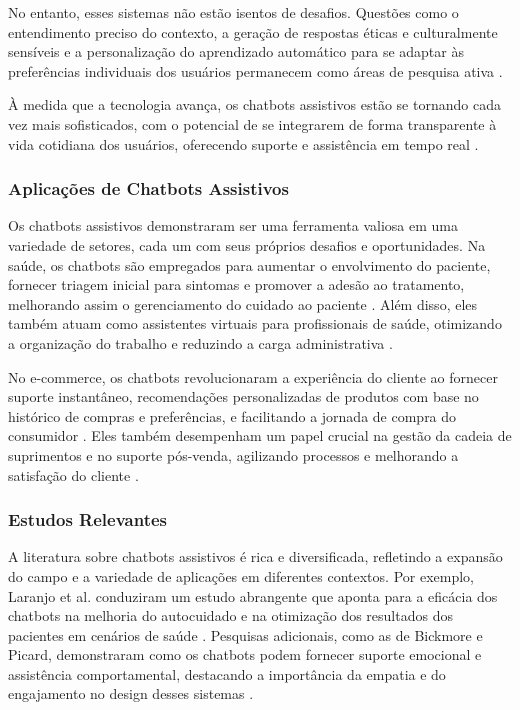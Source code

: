 \documentclass[conference]{IEEEtran}
\begin{document}
No entanto, esses sistemas não estão isentos de desafios. 
Questões como o entendimento preciso do contexto, a geração de respostas éticas e 
culturalmente sensíveis e a personalização do aprendizado automático para se adaptar 
às preferências individuais dos usuários 
permanecem como áreas de pesquisa ativa \cite{Henderson2019}.

À medida que a tecnologia avança, os chatbots assistivos estão se tornando cada vez mais sofisticados, 
com o potencial de se integrarem de forma transparente à vida cotidiana dos usuários, 
oferecendo suporte e assistência em tempo real \cite{McTear2016}.


\subsubsection{Aplicações de Chatbots Assistivos}
Os chatbots assistivos demonstraram ser uma ferramenta valiosa em uma variedade de setores, 
cada um com seus próprios desafios e oportunidades. 
Na saúde, os chatbots são empregados para aumentar o envolvimento do paciente, fornecer triagem inicial 
para sintomas e promover a adesão ao tratamento, 
melhorando assim o gerenciamento do cuidado ao paciente \cite{Bickmore2018}. 
Além disso, eles também atuam como assistentes virtuais para profissionais de saúde, 
otimizando a organização do trabalho e reduzindo a carga administrativa \cite{Jiang2017}.

No e-commerce, os chatbots revolucionaram a experiência do cliente ao fornecer suporte instantâneo, 
recomendações personalizadas de produtos com base no histórico de compras e preferências, 
e facilitando a jornada de compra do consumidor \cite{Dale2016}. 
Eles também desempenham um papel crucial na gestão da cadeia de suprimentos e no suporte pós-venda, 
agilizando processos e melhorando a satisfação do cliente \cite{VanPinxteren2020}.



\subsubsection{Estudos Relevantes}
A literatura sobre chatbots assistivos é rica e diversificada, refletindo a expansão do campo e 
a variedade de aplicações em diferentes contextos. 
Por exemplo, Laranjo et al. conduziram um estudo abrangente que aponta para a eficácia dos chatbots 
na melhoria do autocuidado e na otimização dos resultados dos pacientes em cenários de saúde \cite{Laranjo2018}. 
Pesquisas adicionais, como as de Bickmore e Picard, demonstraram como os chatbots podem fornecer 
suporte emocional e assistência comportamental, destacando a importância da empatia e 
do engajamento no design desses sistemas \cite{Bickmore2005}.
\end{document}
